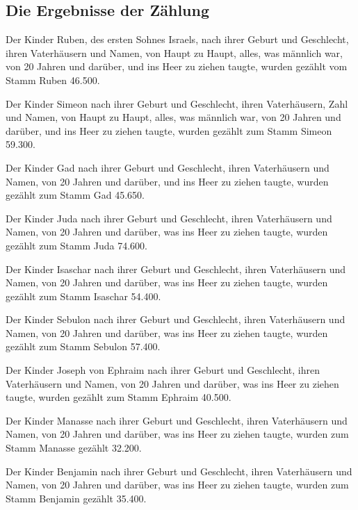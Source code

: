 \hypertarget{die-ergebnisse-der-zuxe4hlung}{%
\subsection{Die Ergebnisse der
Zählung}\label{die-ergebnisse-der-zuxe4hlung}}

 Der Kinder Ruben, des ersten Sohnes Israels, nach ihrer
Geburt und Geschlecht, ihren Vaterhäusern und Namen, von Haupt zu Haupt,
alles, was männlich war, von 20 Jahren und darüber, und ins Heer zu
ziehen taugte,  wurden gezählt vom Stamm Ruben 46.500.

 Der Kinder Simeon nach ihrer Geburt und Geschlecht,
ihren Vaterhäusern, Zahl und Namen, von Haupt zu Haupt, alles, was
männlich war, von 20 Jahren und darüber, und ins Heer zu ziehen taugte,
 wurden gezählt zum Stamm Simeon 59.300.

 Der Kinder Gad nach ihrer Geburt und Geschlecht, ihren
Vaterhäusern und Namen, von 20 Jahren und darüber, und ins Heer zu
ziehen taugte,  wurden gezählt zum Stamm Gad 45.650.

 Der Kinder Juda nach ihrer Geburt und Geschlecht, ihren
Vaterhäusern und Namen, von 20 Jahren und darüber, was ins Heer zu
ziehen taugte,  wurden gezählt zum Stamm Juda 74.600.

 Der Kinder Isaschar nach ihrer Geburt und Geschlecht,
ihren Vaterhäusern und Namen, von 20 Jahren und darüber, was ins Heer zu
ziehen taugte,  wurden gezählt zum Stamm Isaschar 54.400.

 Der Kinder Sebulon nach ihrer Geburt und Geschlecht,
ihren Vaterhäusern und Namen, von 20 Jahren und darüber, was ins Heer zu
ziehen taugte,  wurden gezählt zum Stamm Sebulon 57.400.

 Der Kinder Joseph von Ephraim nach ihrer Geburt und
Geschlecht, ihren Vaterhäusern und Namen, von 20 Jahren und darüber, was
ins Heer zu ziehen taugte,  wurden gezählt zum Stamm
Ephraim 40.500.

 Der Kinder Manasse nach ihrer Geburt und Geschlecht,
ihren Vaterhäusern und Namen, von 20 Jahren und darüber, was ins Heer zu
ziehen taugte,  wurden zum Stamm Manasse gezählt 32.200.

 Der Kinder Benjamin nach ihrer Geburt und Geschlecht,
ihren Vaterhäusern und Namen, von 20 Jahren und darüber, was ins Heer zu
ziehen taugte,  wurden zum Stamm Benjamin gezählt 35.400.

